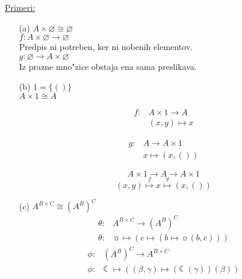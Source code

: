 \underline{Primeri:}
\begin{itemize}
	\item[(a)] 
	\(A \times \varnothing \cong \varnothing\)\\
	\(f: A \times \varnothing \rightarrow \varnothing\)\\
	\hspace*{24pt}Predpis ni potreben, ker ni nobenih elementov.\\
	\(g: \varnothing \rightarrow A \times \varnothing\)\\
	\hspace*{24pt}Iz prazne mno"zice obstaja ena sama preslikava.
	
	\item[(b)]
	\(1 = \{()\}\)\\
	\(A \times 1 \cong A\)
	\begin{multicols}{2}
		\begin{align*}
			f:& A \times 1 \rightarrow A\\
			&(x, y) \mapsto x
		\end{align*}
		
		\columnbreak
		\begin{align*}
			g:& A \rightarrow A \times 1\\
			& x \mapsto (x, ())
		\end{align*}
	\end{multicols}
	\[A \times 1 \rightarrow A \rightarrow A \times 1\]
	\[(x, y) \stackrel{f}{\mapsto} x \stackrel{g}{\mapsto} (x, ())\]
	
	\item[(c)] \(A^{B \times C} \cong (A^B)^C\)
	\begin{align*}
		\theta:& A^{B \times C} \rightarrow (A^B)^C\\
		\theta:& \sun \mapsto (c \mapsto (b \mapsto \sun(b, c)))
	\end{align*}
	\begin{align*}
		\phi:& (A^B)^C \rightarrow A^{B \times C}\\
		\phi:& \leftmoon \mapsto ((\beta, \gamma) \mapsto (\leftmoon(\gamma))(\beta))
	\end{align*}
\end{itemize}
